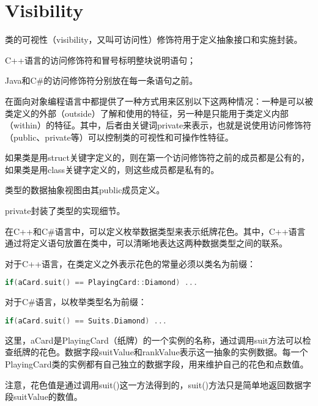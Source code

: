 \section{Visibility}



类的可视性（visibility，又叫可访问性）修饰符用于定义抽象接口和实施封装。

\begin{compactitem}
\item C++语言的访问修饰符和冒号标明整块说明语句；
\item Java和C\#的访问修饰符分别放在每一条语句之前。
\end{compactitem}


在面向对象编程语言中都提供了一种方式用来区别以下这两种情况：一种是可以被类定义的外部（outside）了解和使用的特征，另一种是只能用于类定义内部（within）的特征。其中，后者由关键词private来表示，也就是说使用访问修饰符（public、private等）可以控制类的可视性和可操作性特征。

如果类是用struct关键字定义的，则在第一个访问修饰符之前的成员都是公有的，如果类是用class关键字定义的，则这些成员都是私有的。

\begin{compactitem}
\item 类型的数据抽象视图由其public成员定义。
\item private封装了类型的实现细节。
\end{compactitem}




在C++和C\#语言中，可以定义枚举数据类型来表示纸牌花色。其中，C++语言通过将定义语句放置在类中，可以清晰地表达这两种数据类型之间的联系。

对于C++语言，在类定义之外表示花色的常量必须以类名为前缀：

\begin{lstlisting}[language=C++]
if(aCard.suit() == PlayingCard::Diamond) ...
\end{lstlisting}

对于C\#语言，以枚举类型名为前缀：


\begin{lstlisting}[language=C++]
if(aCard.suit() == Suits.Diamond) ...
\end{lstlisting}

这里，aCard是PlayingCard（纸牌）的一个实例的名称，通过调用suit方法可以检查纸牌的花色。数据字段suitValue和rankValue表示这一抽象的实例数据。每一个PlayingCard类的实例都有自己独立的数据字段，用来维护自己的花色和点数值。

注意，花色值是通过调用suit()这一方法得到的，suit()方法只是简单地返回数据字段suitValue的数值。

